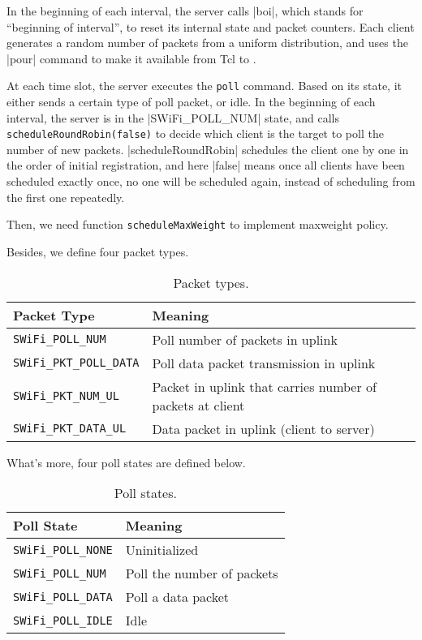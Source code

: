 \documentclass{article}
\begin{document}
In the beginning of each interval, the server calls |boi|, which stands for
``beginning of interval'', to reset its internal state and packet counters.
Each client generates a random number of packets from a uniform distribution,
and uses the |pour| command to make it available from Tcl to \CC.

At each time slot, the server executes the \lstinline |poll| command.
Based on its state, it either sends a certain type of poll packet, or idle.
In the beginning of each interval, the server is in the |SWiFi_POLL_NUM| state,
and calls \lstinline |scheduleRoundRobin(false)| to decide which client is the
target to poll the number of new packets. |scheduleRoundRobin| schedules the
client one by one in the order of initial registration, and here |false| means
once all clients have been scheduled exactly once, no one will be scheduled
again, instead of scheduling from the first one repeatedly.

Then, we need function \lstinline |scheduleMaxWeight| to implement maxweight policy. 

Besides, we define four packet types. 
\begin{table}[h!]
   \centering
   \caption{Packet types.}
   \label{tab:table3}
   \begin{tabular}{| l | l |}
      \hline
      Packet Type  &  Meaning\\ \hline
      \lstinline |SWiFi_POLL_NUM| & Poll number of packets in uplink\\ \hline 
      \lstinline |SWiFi_PKT_POLL_DATA|  & Poll data packet transmission in uplink\\ \hline 
      \lstinline |SWiFi_PKT_NUM_UL| & Packet in uplink that carries number of packets at client\\ \hline 
      \lstinline |SWiFi_PKT_DATA_UL| & Data packet in uplink (client to server)\\  
     \hline
   \end{tabular}
\end{table}
 
  
What's more, four poll states are defined below. 
\begin{table}[h!]
   \centering
   \caption{Poll states.}
   \label{tab:table4}
   \begin{tabular}{| l | l |}
      \hline
      Poll State  &  Meaning\\ \hline
      \lstinline |SWiFi_POLL_NONE| & Uninitialized \\ \hline 
      \lstinline |SWiFi_POLL_NUM|  & Poll the number of packets\\ \hline 
      \lstinline |SWiFi_POLL_DATA| & Poll a data packet\\ \hline 
      \lstinline |SWiFi_POLL_IDLE| & Idle\\  
     \hline
   \end{tabular}
\end{table}
     
\end{document}
